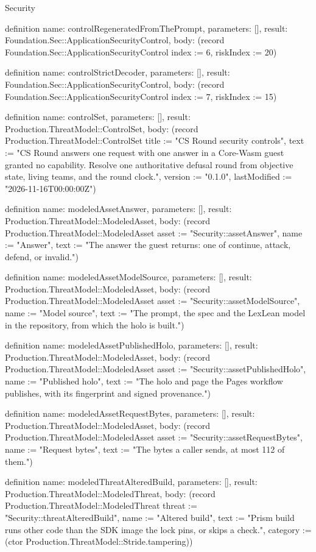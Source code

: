 \begin{lexlean}{Security}
\begin{semanticmodule}
definition{
  name: controlRegeneratedFromThePrompt,
  parameters: [],
  result: Foundation.Sec::ApplicationSecurityControl,
  body: (record Foundation.Sec::ApplicationSecurityControl {index := 6, riskIndex := 20})
}

definition{
  name: controlStrictDecoder,
  parameters: [],
  result: Foundation.Sec::ApplicationSecurityControl,
  body: (record Foundation.Sec::ApplicationSecurityControl {index := 7, riskIndex := 15})
}

definition{
  name: controlSet,
  parameters: [],
  result: Production.ThreatModel::ControlSet,
  body: (record Production.ThreatModel::ControlSet {title := "CS Round security controls", text := "CS Round answers one request with one answer in a Core-Wasm guest granted no capability. Resolve one authoritative defusal round from objective state, living teams, and the round clock.", version := "0.1.0", lastModified := "2026-11-16T00:00:00Z"})
}

definition{
  name: modeledAssetAnswer,
  parameters: [],
  result: Production.ThreatModel::ModeledAsset,
  body: (record Production.ThreatModel::ModeledAsset {asset := "Security::assetAnswer", name := "Answer", text := "The answer the guest returns: one of continue, attack, defend, or invalid."})
}

definition{
  name: modeledAssetModelSource,
  parameters: [],
  result: Production.ThreatModel::ModeledAsset,
  body: (record Production.ThreatModel::ModeledAsset {asset := "Security::assetModelSource", name := "Model source", text := "The prompt, the spec and the LexLean model in the repository, from which the holo is built."})
}

definition{
  name: modeledAssetPublishedHolo,
  parameters: [],
  result: Production.ThreatModel::ModeledAsset,
  body: (record Production.ThreatModel::ModeledAsset {asset := "Security::assetPublishedHolo", name := "Published holo", text := "The holo and page the Pages workflow publishes, with its fingerprint and signed provenance."})
}

definition{
  name: modeledAssetRequestBytes,
  parameters: [],
  result: Production.ThreatModel::ModeledAsset,
  body: (record Production.ThreatModel::ModeledAsset {asset := "Security::assetRequestBytes", name := "Request bytes", text := "The bytes a caller sends, at most 112 of them."})
}

definition{
  name: modeledThreatAlteredBuild,
  parameters: [],
  result: Production.ThreatModel::ModeledThreat,
  body: (record Production.ThreatModel::ModeledThreat {threat := "Security::threatAlteredBuild", name := "Altered build", text := "Prism build runs other code than the SDK image the lock pins, or skips a check.", category := (ctor Production.ThreatModel::Stride.tampering)})
}


\end{semanticmodule}
\end{lexlean}
